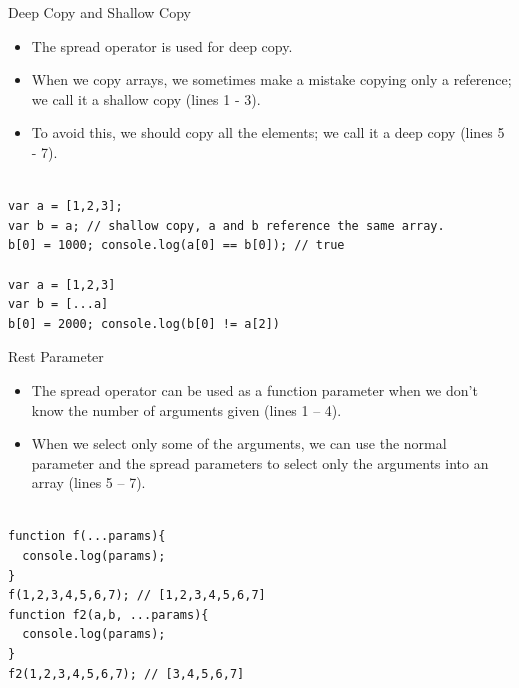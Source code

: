 \begin{frame}[fragile]{Deep Copy and Shallow Copy}

\begin{itemize}
	\item The spread operator is used for deep copy. 
	\item When we copy arrays, we sometimes make a mistake copying only a reference; we call it a shallow copy (lines 1 - 3). 
	\item To avoid this, we should copy all the elements; we call it a deep copy (lines 5 - 7).
\end{itemize}

\begin{Code}{}%
\begin{lstlisting}[firstnumber=1, label=glabels, xleftmargin=0pt, basicstyle=\scriptsize]% 

var a = [1,2,3];
var b = a; // shallow copy, a and b reference the same array.
b[0] = 1000; console.log(a[0] == b[0]); // true

var a = [1,2,3]
var b = [...a]
b[0] = 2000; console.log(b[0] != a[2])
\end{lstlisting}%
\end{Code}%
\end{frame}


\begin{frame}[fragile]{Rest Parameter}

\begin{itemize}
	\item The spread operator can be used as a function parameter when we don't know the number of arguments given (lines 1 -- 4).
	\item When we select only some of the arguments, we can use the normal parameter and the spread parameters to select only the arguments into an array (lines 5 -- 7). 
\end{itemize}

\begin{Code}{}%
\begin{lstlisting}[firstnumber=1, label=glabels, xleftmargin=0pt, basicstyle=\tiny]% 

function f(...params){
  console.log(params); 
}
f(1,2,3,4,5,6,7); // [1,2,3,4,5,6,7]
function f2(a,b, ...params){
  console.log(params); 
}
f2(1,2,3,4,5,6,7); // [3,4,5,6,7]
\end{lstlisting}%
\end{Code}%

\end{frame}

